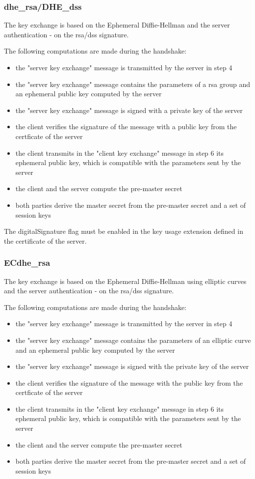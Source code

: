 \subsubsection*{\gls{dhe}\_\gls{rsa}/DHE\_\gls{dss}}
The key exchange is based on the Ephemeral Diffie-Hellman and the server authentication - on the \gls{rsa}/\gls{dss} signature.

The following computations are made during the handshake:
\begin{itemize}
	\item the "server key exchange" message is transmitted by the server in step 4
	\item the "server key exchange" message contains the parameters of a \gls{rsa} group and an ephemeral public key computed by the server
	\item the "server key exchange" message is signed with a private key of the server
	\item the client verifies the signature of the message with a public key from the certficate of the server
	\item the client transmits in the "client key exchange" message in step 6 its ephemeral public key, which is compatible with the parameters sent by the server
	\item the client and the server compute the pre-master secret
	\item both parties derive the master secret from the pre-master secret and a set of session keys
\end{itemize}

The digitalSignature flag must be enabled in the key usage extension defined in the certificate of the server.

\subsubsection*{EC\gls{dhe}\_\gls{rsa}}
The key exchange is based on the Ephemeral Diffie-Hellman using elliptic curves and the server authentication - on the \gls{rsa}/\gls{dss} signature.

The following computations are made during the handshake:
\begin{itemize}
	\item the "server key exchange" message is transmitted by the server in step 4 
	\item the "server key exchange" message contains the parameters of an elliptic curve and an ephemeral public key computed by the server
	\item the "server key exchange" message is signed with the private key of the server
	\item the client verifies the signature of the message with the public key from the certficate of the server
	\item the client transmits in the "client key exchange" message in step 6 its ephemeral public key, which is compatible with the parameters sent by the server
	\item the client and the server compute the pre-master secret
	\item both parties derive the master secret from the pre-master secret and a set of session keys
\end{itemize}

